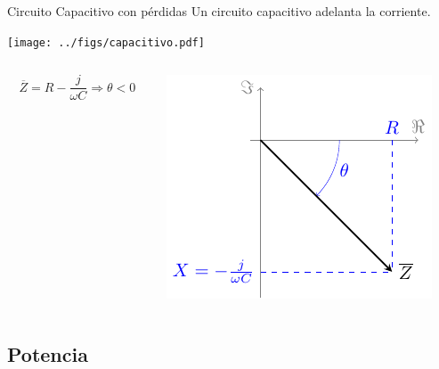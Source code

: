 \documentclass[xcolor={usenames,svgnames,dvipsnames}]{beamer}
\begin{document}
\begin{frame}[label={sec:org2a0005d}]{Circuito Capacitivo con pérdidas}
Un circuito capacitivo \alert{adelanta la corriente}.

\begin{center}
\texttt{[image: ../figs/capacitivo.pdf]}
\end{center}

\begin{columns}
\begin{column}{0.45\columnwidth}
\[
\overline{Z} = R - \frac{j}{\omega C} \Rightarrow \boxed{\theta < 0}
\]
\end{column}

\begin{column}{0.55\columnwidth}
\begin{center}
\includegraphics[height=0.45\textheight]{../figs/fasorCondensadorReal.pdf}
\end{center}
\end{column}
\end{columns}
\end{frame}


\subsection{Potencia}
\label{sec:org0a502ee}
\end{document}
